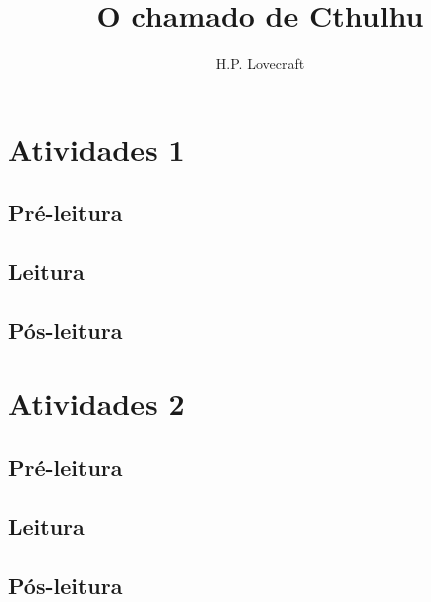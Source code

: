 \documentclass{article}
\begin{document}
\newcommand{\AutorLivro}{H.P. Lovecraft}
\newcommand{\TituloLivro}{O chamado de Cthulhu}
\newcommand{\Tema}{Ficção, mistério e fantasia}
\newcommand{\Genero}{Conto, crônica e novela}
\newcommand{\issnppub}{---}
\newcommand{\issnepub}{---}
\newcommand{\colaborador}{\textbf{Fulano de Tal} é uma pessoa incrível e vai fazer um bom serviço.}


\title{\TituloLivro}
\author{\AutorLivro}
\def\authornotes{\colaborador}

\date{}
\maketitle
\tableofcontents




\section{Atividades 1}


\subsection{Pré-leitura}
\subsection{Leitura}
\subsection{Pós-leitura}



\section{Atividades 2}

\subsection{Pré-leitura}
\subsection{Leitura}
\subsection{Pós-leitura}

\lipsum
\end{document}
